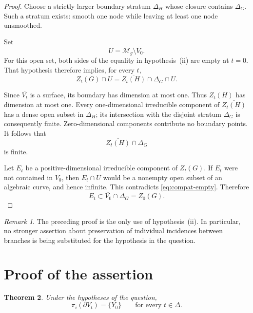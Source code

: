 \documentclass[11pt]{article}
\newcommand{\M}{\mathcal M}
\newcommand{\D}{\Delta}
\newcommand{\ol}[1]{\overline{#1}}
\newtheorem{theorem}{Theorem}[section]
\theoremstyle{remark}
\newtheorem{remark}[theorem]{Remark}
\begin{document}
\begin{proof}
Choose a strictly larger boundary stratum \(\Delta_H\) whose
closure contains \(\Delta_G\). Such a stratum exists: smooth
one node while leaving at least one node unsmoothed.

Set
\[
U=\ol{\M}_g\setminus\ol{V_0}.
\]
For this open set, both sides of the equality in
hypothesis~(ii) are empty at \(t=0\). That hypothesis therefore
implies, for every \(t\),
\begin{equation}\label{eq:compat-empty}
Z_t(G)\cap U
=
\ol{Z_t(H)}\cap\Delta_G\cap U.
\end{equation}

Since \(\ol{V_t}\) is a surface, its boundary has dimension at
most one. Thus \(Z_t(H)\) has dimension at most one. Every
one-dimensional irreducible component of \(\ol{Z_t(H)}\) has
a dense open subset in \(\Delta_H\); its intersection with the
disjoint stratum \(\Delta_G\) is consequently finite.
Zero-dimensional components contribute no boundary points.
It follows that
\[
\ol{Z_t(H)}\cap\Delta_G
\]
is finite.

Let \(E_t\) be a positive-dimensional irreducible component of
\(Z_t(G)\). If \(E_t\) were not contained in \(\ol{V_0}\), then
\(E_t\cap U\) would be a nonempty open subset of an algebraic
curve, and hence infinite. This contradicts
\eqref{eq:compat-empty}. Therefore
\[
E_t\subset\ol{V_0}\cap\Delta_G=Z_0(G).
\]
\end{proof}

\begin{remark}\label{rem:compatibility}
The preceding proof is the only use of hypothesis~(ii).
In particular, no stronger assertion about preservation of
individual incidences between branches is being substituted
for the hypothesis in the question.
\end{remark}

\section{Proof of the assertion}

\begin{theorem}\label{thm:main}
Under the hypotheses of the question,
\[
\pi_i(\partial V_t)=\{Y_0\}
\qquad\text{for every }t\in\D.
\]
\end{theorem}
\end{document}
